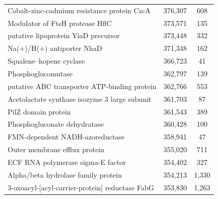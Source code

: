 \begin{singlespace}
\begin{longtable}{p{} cc}
                                               Cobalt-zinc-cadmium resistance protein CzcA &                     376,307 &           608 \\
                                                           Modulator of FtsH protease HflC &                     373,571 &           135 \\
                                                       putative lipoprotein YiaD precursor &                     373,448 &           332 \\
                                                                Na(+)/H(+) antiporter NhaD &                     371,348 &           162 \\
                                                                  Squalene--hopene cyclase &                     366,723 &            41 \\
                                                                        Phosphoglucomutase &                     362,797 &           139 \\
                                              putative ABC transporter ATP-binding protein &                     362,766 &           553 \\
                                             Acetolactate synthase isozyme 3 large subunit &                     361,703 &            87 \\
                                                                       PilZ domain protein &                     361,543 &           389 \\
                                                              Phosphogluconate dehydratase &                     360,428 &           100 \\
                                                           FMN-dependent NADH-azoreductase &                     358,941 &            47 \\
                                                             Outer membrane efflux protein &                     355,020 &           711 \\
                                                         ECF RNA polymerase sigma-E factor &                     354,402 &           327 \\
                                                       Alpha/beta hydrolase family protein &                     354,213 &         1,330 \\
                                           3-oxoacyl-[acyl-carrier-protein] reductase FabG &                     353,830 &         1,263 \\

\end{longtable}
\end{singlespace}
